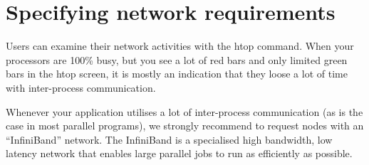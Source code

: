 %
%
%
%
%
%
%
%
%
%

\section{Specifying network requirements}

Users can examine their network activities with the htop command. When your
processors are 100\% busy, but you see a lot of red bars and only limited green
bars in the htop screen, it is mostly an indication that they loose a lot of
time with inter-process communication.

Whenever your application utilises a lot of inter-process communication (as is
the case in most parallel programs), we strongly recommend to request nodes
with an ``InfiniBand'' network. The InfiniBand is a specialised high bandwidth,
low latency network that enables large parallel jobs to run as efficiently as
possible.

